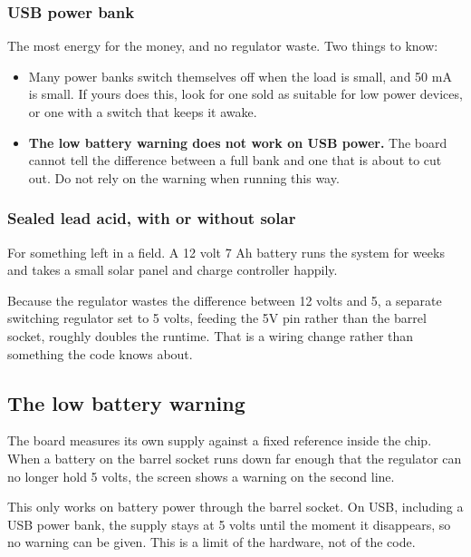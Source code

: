 \documentclass[11pt,a4paper]{article}
\newenvironment{caution}
  {\par\medskip\noindent
   \begin{lrbox}{\nfbox}\begin{minipage}{0.94\linewidth}\vspace{2pt}}
  {\vspace{2pt}\end{minipage}\end{lrbox}%
   \fcolorbox{warn}{white}{\usebox{\nfbox}}\par\medskip}
\begin{document}
\subsubsection*{USB power bank}

The most energy for the money, and no regulator waste. Two things to know:

\begin{itemize}
  \item Many power banks switch themselves off when the load is small, and 50
        mA is small. If yours does this, look for one sold as suitable for low
        power devices, or one with a switch that keeps it awake.
  \item \textbf{The low battery warning does not work on USB power.} The board
        cannot tell the difference between a full bank and one that is about to
        cut out. Do not rely on the warning when running this way.
\end{itemize}

\subsubsection*{Sealed lead acid, with or without solar}

For something left in a field. A 12 volt 7 Ah battery runs the system for weeks
and takes a small solar panel and charge controller happily.

Because the regulator wastes the difference between 12 volts and 5, a separate
switching regulator set to 5 volts, feeding the 5V pin rather than the barrel
socket, roughly doubles the runtime. That is a wiring change rather than
something the code knows about.

\subsection{The low battery warning}

The board measures its own supply against a fixed reference inside the chip.
When a battery on the barrel socket runs down far enough that the regulator can
no longer hold 5 volts, the screen shows a warning on the second line.

\begin{caution}
This only works on battery power through the barrel socket. On USB, including
a USB power bank, the supply stays at 5 volts until the moment it disappears,
so no warning can be given. This is a limit of the hardware, not of the code.
\end{caution}
\end{document}
